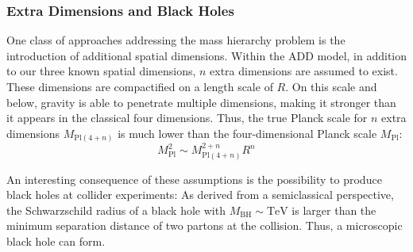 \subsubsection{Extra Dimensions and Black Holes}
One class of approaches addressing the mass hierarchy problem is the introduction of additional spatial dimensions. Within the \acf{ADD} model\cite{Arkani-Hamed:Hierarchyproblemnew}, in addition to our three known spatial dimensions, $n$ extra dimensions are assumed to exist. These dimensions are compactified on a length scale of $R$. On this scale and below, gravity is able to penetrate multiple dimensions, making it stronger than it appears in the classical four dimensions. Thus, the true Planck scale for $n$ extra dimensions $M_{\text{Pl}(4+n)}$ is much lower than the four-dimensional Planck scale $M_\text{Pl}$:
\begin{equation}
    M_\text{Pl}^2 \sim M_{\text{Pl}(4+n)}^{2+n} R^n 
\end{equation}

An interesting consequence of these assumptions is the possibility to produce black holes at collider experiments\cite{Dimopoulos:BlackHolesLHCa}: As derived from a semiclassical perspective, the Schwarzschild radius of a black hole with $M_\text{BH} \sim \si{\TeV}$ is larger than the minimum separation distance of two partons at the collision. Thus, a microscopic black hole can form.

